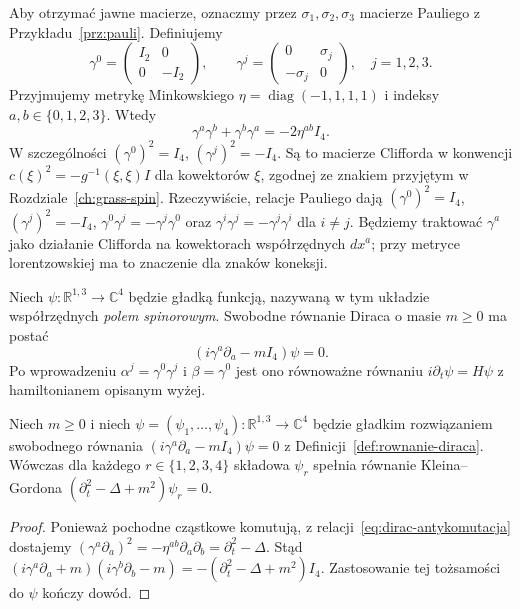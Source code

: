Aby otrzymać jawne macierze, oznaczmy przez
$\sigma_1,\sigma_2,\sigma_3$ macierze Pauliego z
Przykładu~\ref{prz:pauli}. Definiujemy
\begin{equation}\label{eq:dirac-gamma-reprezentacja}
 \gamma^0=\begin{pmatrix}I_2&0\\0&-I_2\end{pmatrix},
 \qquad
 \gamma^j=\begin{pmatrix}0&\sigma_j\\-\sigma_j&0\end{pmatrix},
 \quad j=1,2,3.
\end{equation}
Przyjmujemy metrykę Minkowskiego
$\eta=\operatorname{diag}(-1,1,1,1)$ i indeksy
$a,b\in\{0,1,2,3\}$. Wtedy
\begin{equation}\label{eq:dirac-antykomutacja}
 \gamma^a\gamma^b+\gamma^b\gamma^a=-2\eta^{ab}I_4.
\end{equation}
W szczególności $(\gamma^0)^2=I_4$,
$(\gamma^j)^2=-I_4$. Są to macierze Clifforda w konwencji
$c(\xi)^2=-g^{-1}(\xi,\xi)I$ dla kowektorów $\xi$,
zgodnej ze znakiem przyjętym w Rozdziale~\ref{ch:grass-spin}.
Rzeczywiście, relacje Pauliego dają
$(\gamma^0)^2=I_4$, $(\gamma^j)^2=-I_4$,
$\gamma^0\gamma^j=-\gamma^j\gamma^0$ oraz
$\gamma^i\gamma^j=-\gamma^j\gamma^i$ dla $i\ne j$.
Będziemy traktować $\gamma^a$ jako działanie Clifforda
na kowektorach współrzędnych $dx^a$; przy metryce
lorentzowskiej ma to znaczenie dla znaków koneksji.

\begin{definicja}
\label{def:rownanie-diraca}
Niech $\psi:\mathbb R^{1,3}\to\mathbb C^4$ będzie gładką
funkcją, nazywaną w tym układzie współrzędnych
\emph{polem spinorowym}. Swobodne równanie Diraca
o masie $m\geq0$ ma postać
\begin{equation}\label{eq:dirac-minkowski}
 (i\gamma^a\partial_a-mI_4)\psi=0.
\end{equation}
Po wprowadzeniu $\alpha^j=\gamma^0\gamma^j$
i $\beta=\gamma^0$ jest ono równoważne równaniu
$i\partial_t\psi=H\psi$ z hamiltonianem opisanym wyżej.
\end{definicja}

\begin{stwierdzenie}
\label{prop:dirac-kwadrat}
Niech $m\geq0$ i niech
$\psi=(\psi_1,\ldots,\psi_4):\mathbb R^{1,3}\to\mathbb C^4$
będzie gładkim rozwiązaniem swobodnego równania
$ (i\gamma^a\partial_a-mI_4)\psi=0$ z
Definicji~\ref{def:rownanie-diraca}.
Wówczas dla każdego $r\in\{1,2,3,4\}$ składowa
$\psi_r$ spełnia równanie Kleina--Gordona
$(\partial_t^2-\Delta+m^2)\psi_r=0$.
\end{stwierdzenie}
\begin{proof}
Ponieważ pochodne cząstkowe komutują, z
relacji~\eqref{eq:dirac-antykomutacja} dostajemy
$(\gamma^a\partial_a)^2
=-\eta^{ab}\partial_a\partial_b=\partial_t^2-\Delta$.
Stąd
$(i\gamma^a\partial_a+m)(i\gamma^b\partial_b-m)
=-(\partial_t^2-\Delta+m^2)I_4$.
Zastosowanie tej tożsamości do $\psi$ kończy dowód.
\end{proof}

